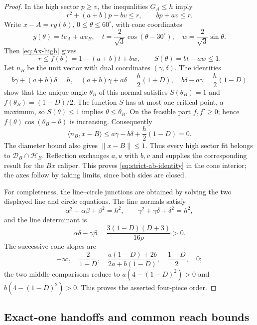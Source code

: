 \begin{proof}
In the high sector $p\ge v$, the inequalities $G_A\le h$ imply
\begin{equation}
 r^2+(a+b)p-bv\le r,\qquad bp+av\le r.          \label{eq:Ax-high}
\end{equation}
Write $x-A=ry(\theta)$, $0\le\theta\le60^\circ$, with cone coordinates
\[
 y(\theta)=te_A+we_B,\quad
 t=\frac2{\sqrt3}\cos(\theta-30^\circ),\quad
 w=\frac2{\sqrt3}\sin\theta.
\]
Then \eqref{eq:Ax-high} gives
\[
 r\le f(\theta)=1-(a+b)t+bw,\qquad S(\theta)=bt+aw\le1.
\]
Let $n_B$ be the unit vector with dual coordinates $(\gamma,\delta)$.
The identities
\[
 b\gamma+(a+b)\delta=h,\quad
 (a+b)\gamma+a\delta=\frac h2(1+D),\quad
 b\delta-a\gamma=\frac h2(1-D)
\]
show that the unique angle $\theta_B$ of this normal satisfies
$S(\theta_B)=1$ and $f(\theta_B)=(1-D)/2$.  The function $S$ has at most
one critical point, a maximum, so $S(\theta)\le1$ implies
$\theta\le\theta_B$.  On the feasible part $f,f'\ge0$; hence
$f(\theta)\cos(\theta_B-\theta)$ is increasing.  Consequently
\[
 \langle n_B,x-B\rangle
 \le a\gamma-b\delta+\frac h2(1-D)=0.
\]
The diameter bound also gives $\lVert x-B\rVert\le1$.  Thus every high
sector fit belongs to $\mathcal D_B\cap\mathcal H_B$.  Reflection exchanges
$a,u$ with $b,v$ and supplies the corresponding result for the $Bx$
caliper.  This proves \eqref{eq:strict-ab-identity} in the cone interior;
the axes follow by taking limits, since both sides are closed.

For completeness, the line--circle junctions are obtained by solving the
two displayed line and circle equations.  The line normals satisfy
\[
 \alpha^2+\alpha\beta+\beta^2=h^2,\qquad
 \gamma^2+\gamma\delta+\delta^2=h^2,
\]
and the line determinant is
\[
 \alpha\delta-\gamma\beta
 =\frac{3(1-D)(D+3)}{16\rho}>0.
\]
The successive cone slopes are
\[
 +\infty,\quad \frac2{1-D},\quad
 \frac{a(1-D)+2b}{2a+b(1-D)},\quad
 \frac{1-D}{2},\quad0;
\]
the two middle comparisons reduce to
$a(4-(1-D)^2)>0$ and $b(4-(1-D)^2)>0$.  This proves the asserted four-piece
order.
\end{proof}



\subsection{Exact-one handoffs and common reach bounds}


